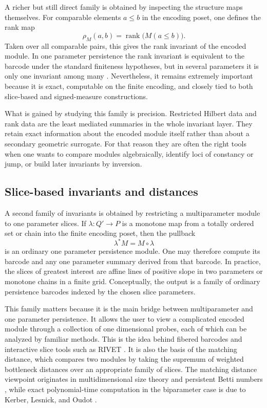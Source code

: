 \documentclass[11pt]{article}
\theoremstyle{definition}
\theoremstyle{remark}
\begin{document}
A richer but still direct family is obtained by inspecting the structure maps themselves.  For comparable elements $a\leq b$ in the encoding poset, one defines the rank map
\[
\rho_M(a,b)=\operatorname{rank}\bigl(M(a\leq b)\bigr).
\]
Taken over all comparable pairs, this gives the rank invariant of the encoded module.  In one parameter persistence the rank invariant is equivalent to the barcode under the standard finiteness hypotheses, but in several parameters it is only one invariant among many \cite{CZ09,Les15}.  Nevertheless, it remains extremely important because it is exact, computable on the finite encoding, and closely tied to both slice-based and signed-measure constructions.

What is gained by studying this family is precision.  Restricted Hilbert data and rank data are the least mediated summaries in the whole invariant layer.  They retain exact information about the encoded module itself rather than about a secondary geometric surrogate.  For that reason they are often the right tools when one wants to compare modules algebraically, identify loci of constancy or jump, or build later invariants by inversion.

\subsection{Slice-based invariants and distances}

A second family of invariants is obtained by restricting a multiparameter module to one parameter slices.  If $\lambda : Q'\to P$ is a monotone map from a totally ordered set or chain into the finite encoding poset, then the pullback
\[
\lambda^*M=M\circ \lambda
\]
is an ordinary one parameter persistence module.  One may therefore compute its barcode and any one parameter summary derived from that barcode.  In practice, the slices of greatest interest are affine lines of positive slope in two parameters or monotone chains in a finite grid. Conceptually, the output is a family of ordinary persistence barcodes indexed by the chosen slice parameters.

This family matters because it is the main bridge between multiparameter and one parameter persistence.  It allows the user to view a complicated encoded module through a collection of one dimensional probes, each of which can be analyzed by familiar methods.  This is the idea behind fibered barcodes and interactive slice tools such as RIVET \cite{LW15}.  It is also the basis of the matching distance, which compares two modules by taking the supremum of weighted bottleneck distances over an appropriate family of slices.  The matching distance viewpoint originates in multidimensional size theory and persistent Betti numbers \cite{BCFGL08}, while exact polynomial-time computation in the biparameter case is due to Kerber, Lesnick, and Oudot \cite{KLO20}.
\end{document}
